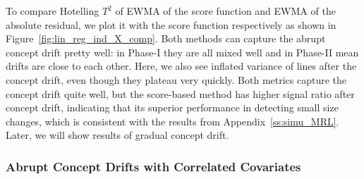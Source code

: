 \documentclass[twoside,11pt]{article}
\begin{document}
\begin{appendix}
To compare Hotelling $T^2$ of EWMA of the score function and EWMA of the absolute residual, we plot it with the score function respectively as shown in Figure~\ref{fig:lin_reg_ind_X_comp}. Both methods can capture the abrupt concept drift pretty well: in Phase-I they are all mixed well and in Phase-II mean drifts are close to each other. Here, we also see inflated variance of lines after the concept drift, even though they plateau very quickly. Both metrics capture the concept drift quite well, but the score-based method has higher signal ratio after concept drift, indicating that its superior performance in detecting small size changes, which is consistent with the results from Appendix~\ref{ss:simu_MRL}. Later, we will show results of gradual concept drift.

\subsubsection{Abrupt Concept Drifts with Correlated Covariates}


\end{appendix}
\end{document}
